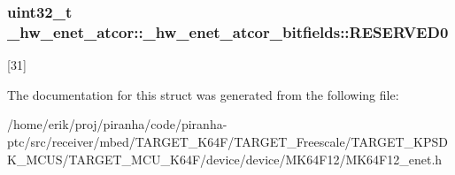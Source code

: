 \subsubsection[{\texorpdfstring{R\+E\+S\+E\+R\+V\+E\+D0}{RESERVED0}}]{\setlength{\rightskip}{0pt plus 5cm}uint32\+\_\+t \+\_\+hw\+\_\+enet\+\_\+atcor\+::\+\_\+hw\+\_\+enet\+\_\+atcor\+\_\+bitfields\+::\+R\+E\+S\+E\+R\+V\+E\+D0}\hypertarget{struct__hw__enet__atcor_1_1__hw__enet__atcor__bitfields_a5218e4ad37d16e513a84966532ad63a5}{}\label{struct__hw__enet__atcor_1_1__hw__enet__atcor__bitfields_a5218e4ad37d16e513a84966532ad63a5}
\mbox{[}31\mbox{]} 

The documentation for this struct was generated from the following file\+:\begin{DoxyCompactItemize}
\item 
/home/erik/proj/piranha/code/piranha-\/ptc/src/receiver/mbed/\+T\+A\+R\+G\+E\+T\+\_\+\+K64\+F/\+T\+A\+R\+G\+E\+T\+\_\+\+Freescale/\+T\+A\+R\+G\+E\+T\+\_\+\+K\+P\+S\+D\+K\+\_\+\+M\+C\+U\+S/\+T\+A\+R\+G\+E\+T\+\_\+\+M\+C\+U\+\_\+\+K64\+F/device/device/\+M\+K64\+F12/M\+K64\+F12\+\_\+enet.\+h\end{DoxyCompactItemize}
